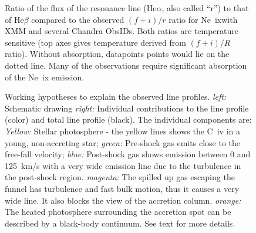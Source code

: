 \documentclass[letterpaper,11pt,twocolumn]{article}
\begin{document}
\begin{figure}[h!]
\centering
{}
\caption{Ratio of the flux of the resonance line (He$\alpha$, also
  called ``r'') to that of He$\beta$ compared to the observed
  $(f+i)/r$ ratio for Ne~{\sc ix}with XMM and several Chandra
  ObsIDs. Both ratios are temperature sensitive (top axes gives
  temperature derived from $(f+i)/R$ ratio). Without absorption,
  datapoints points would lie on the dotted line.  Many of the
  observations require significant absorption of the Ne~{\sc ix}
  emission.
\label{fig:allspec} }
\end{figure}

\begin{figure}
\centering
{}
\caption{\label{fig:CIVsketch} Working hypotheses to explain the
  observed line profiles. \emph{left:} Schematic drawing \emph{right:}
  Individual contributions to the line profile (color) and total line
  profile (black). The individual components are: \emph{Yellow:}
  Stellar photosphere - the yellow lines shows the C~{\sc iv} in a
  young, non-accreting star; \emph{green:} Pre-shock gas emits close
  to the free-fall velocity; \emph{blue:} Post-shock gas shows
  emission between 0 and 125~km/s with a very wide emission line due
  to the turbulence in the post-shock region. \emph{magenta:} The
  spilled up gas escaping the funnel has turbulence and fast bulk
  motion, thus it causes a very wide line. It also blocks the view of
  the accretion column. \emph{orange:} The heated photosphere
  surrounding the accretion spot can be described by a black-body
  continuum. See text for more details.}
\end{figure}
\end{document}
